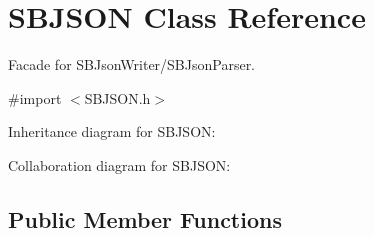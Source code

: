 \hypertarget{interface_s_b_j_s_o_n}{
\section{\-S\-B\-J\-S\-O\-N \-Class \-Reference}
\label{interface_s_b_j_s_o_n}
}


\-Facade for \-S\-B\-Json\-Writer/\-S\-B\-Json\-Parser.  




{\ttfamily \#import $<$\-S\-B\-J\-S\-O\-N.\-h$>$}



\-Inheritance diagram for \-S\-B\-J\-S\-O\-N\-:


\-Collaboration diagram for \-S\-B\-J\-S\-O\-N\-:
\subsection*{\-Public \-Member \-Functions}
